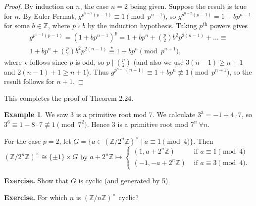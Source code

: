 \documentclass{article}
\theoremstyle{definition}
\newtheorem{example}[theorem]{Example}
\theoremstyle{remark}
\begin{document}
\begin{proof}
    By induction on $n$, the case $n=2$ being given. Suppose the result is true for $n$. By Euler-Fermat, $g^{p^{n-2}(p-1)} \equiv 1 \pmod{p^{n-1}}$, so $g^{p^{n-2}(p-1)} = 1 +b p^{n-1}$ for some $b \in \mathbb{Z}$, where $p \nmid b$ by the induction hypothesis. Taking $p^{\text{th}}$ powers gives 
    \begin{align*}
        g^{p^{n-1}(p-1)} = (1+bp^{n-1})^p = 1 + bp^n + {{p} \choose {2}}b^2p^{2(n-1)}+\ldots \equiv \\ 1 + bp^n + {{p} \choose {2}}b^2 p^{2(n-1)} \stackrel{\star}{\equiv } 1 + bp^n \pmod{p^{n+1}},
    \end{align*}
    where $\star$ follows since $p$ is odd, so $p \mid {{p}\choose{2}}$ (and also we use $3(n-1)\ge n+1$ and $2(n-1)+1\ge n+1$). Thus $g^{p^{n-1}(n-1)} \equiv 1 +bp^n \not\equiv 1 \pmod{p^{n+1}}$, so the result follows for $n+1$.
\end{proof}
This completes the proof of Theorem 2.24.

\begin{example}
    We saw $3$ is a primitive root mod $7$. We calculate $3^3 = -1 + 4\cdot 7$, so $3^6 \equiv 1 - 8\cdot 7 \not\equiv 1 \pmod{7^2}$. Hence $3$ is a primitive root mod $7^n ~\forall n$.
\end{example}

For the case $p=2$, let $G = \{a \in (\mathbb{Z}/2^n\mathbb{Z})^{\times} ~|~ a \equiv 1 \pmod{4}\}$. Then $(\mathbb{Z}/2^n\mathbb{Z})^{\times} \cong \{\pm 1\} \times G$ by $a+2^n\mathbb{Z} \mapsto \begin{cases}
    (1, a+2^n\mathbb{Z}) &\text{ if }a \equiv 1\pmod{4}\\
    (-1, -a+2^n\mathbb{Z}) &\text{ if }a \equiv 3\pmod{4}.
\end{cases}$

\textbf{Exercise.} Show that $G$ is cyclic (and generated by 5).

\textbf{Exercise.} For which $n$ is $(\mathbb{Z}/n\mathbb{Z})^{\times}$ cyclic? 
\end{document}
